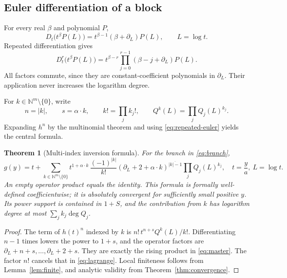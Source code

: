 \documentclass[11pt,a4paper]{article}
\newcommand{\N}{\mathbb N}
\newcommand{\dd}{\partial_L}
\newcommand{\rising}[2]{\left(#1\right)^{\overline{#2}}}
\newtheorem{theorem}{Theorem}[section]
\theoremstyle{definition}
\begin{document}
\subsection{Euler differentiation of a block}
For every real \(\beta\) and polynomial \(P\),
\begin{equation}\label{eq:euler}
 D_t\bigl(t^\beta P(L)\bigr)
 =t^{\beta-1}(\beta+\dd)P(L),\qquad L=\log t.
\end{equation}
Repeated differentiation gives
\begin{equation}\label{eq:repeated-euler}
 D_t^r\bigl(t^\beta P(L)\bigr)
 =t^{\beta-r}\prod_{j=0}^{r-1}(\beta-j+\dd)P(L).
\end{equation}
All factors commute, since they are constant-coefficient polynomials in
\(\dd\). Their application never increases the logarithm degree.

For \(k\in\N^m\setminus\{0\}\), write
\[
 n=|k|,\qquad s=\alpha\cdot k,\qquad
 k!=\prod_j k_j!,\qquad Q^k(L)=\prod_j Q_j(L)^{k_j}.
\]
Expanding \(h^n\) by the multinomial theorem and using
\eqref{eq:repeated-euler} yields the central formula.

\begin{theorem}[Multi-index inversion formula]\label{thm:coefficients}
For the branch in \eqref{eq:branch},
\begin{equation}\label{eq:master}
 \boxed{\displaystyle
 g(y)=t+\sum_{k\in\N^m\setminus\{0\}}
 t^{1+\alpha\cdot k}\,
 \frac{(-1)^{|k|}}{k!}
 \rising{\dd+2+\alpha\cdot k}{|k|-1}
 \prod_jQ_j(L)^{k_j},\quad
 t=\frac ya,\ L=\log t.}
\end{equation}
An empty operator product equals the identity. This formula is formally
well-defined coefficientwise; it is absolutely convergent for sufficiently
small positive \(y\). Its power support is contained in \(1+S\), and the
contribution from \(k\) has logarithm degree at most
\(\sum_jk_j\deg Q_j\).
\end{theorem}
\begin{proof}
The term of \(h(t)^n\) indexed by \(k\) is
\(n!\,t^{n+s}Q^k(L)/k!\). Differentiating \(n-1\) times lowers the power to
\(1+s\), and the operator factors are
\(\dd+n+s,\ldots,\dd+2+s\). They are exactly the rising product in
\eqref{eq:master}. The factor \(n!\) cancels that in \eqref{eq:lagrange}.
Local finiteness follows from Lemma~\ref{lem:finite}, and analytic validity
from Theorem~\ref{thm:convergence}.
\end{proof}
\end{document}

